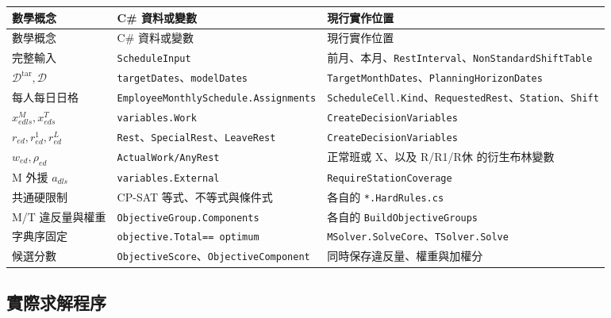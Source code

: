 \documentclass[a4paper,12pt]{article}
\begin{document}
\footnotesize
\setlength{\tabcolsep}{3pt}
\begin{longtable}{p{2.7cm}p{5.3cm}p{6.4cm}}
  \toprule
  數學概念 & C\# 資料或變數 & 現行實作位置 \\
  \midrule
  \endfirsthead
  \toprule
  數學概念 & C\# 資料或變數 & 現行實作位置 \\
  \midrule
  \endhead
  完整輸入 & \texttt{ScheduleInput} & 前月、本月、\texttt{RestInterval}、\texttt{NonStandardShiftTable} \\
  \(\mathcal D^{\mathrm{tar}},\mathcal D\) & \texttt{targetDates}、\texttt{modelDates} & \texttt{TargetMonthDates}、\texttt{PlanningHorizonDates} \\
  每人每日日格 & \texttt{EmployeeMonthlySchedule.}\newline\texttt{Assignments} & \texttt{ScheduleCell.Kind}、\texttt{RequestedRest}、\texttt{Station}、\texttt{Shift} \\
  \(x^M_{edls},x^T_{eds}\) & \texttt{variables.Work} & \texttt{CreateDecisionVariables} \\
  \(r_{ed},r^1_{ed},r^L_{ed}\) & \texttt{Rest}、\texttt{SpecialRest}、\texttt{LeaveRest} & \texttt{CreateDecisionVariables} \\
  \(w_{ed},\rho_{ed}\) & \texttt{ActualWork/AnyRest} & 正常班或 X、以及 R/R1/R休 的衍生布林變數 \\
  M 外援 \(a_{dls}\) & \texttt{variables.External} & \texttt{RequireStationCoverage} \\
  共通硬限制 & CP-SAT 等式、不等式與條件式 & 各自的 \texttt{*.HardRules.cs} \\
  M/T 違反量與權重 & \texttt{ObjectiveGroup.}\newline\texttt{Components} & 各自的 \texttt{BuildObjectiveGroups} \\
  字典序固定 & \texttt{objective.Total}\newline\texttt{== optimum} & \texttt{MSolver.SolveCore}、\texttt{TSolver.Solve} \\
  候選分數 & \texttt{ObjectiveScore}、\newline\texttt{ObjectiveComponent} & 同時保存違反量、權重與加權分 \\
  \bottomrule
\end{longtable}
\normalsize
\setlength{\tabcolsep}{6pt}

\subsection{實際求解程序}
\end{document}
